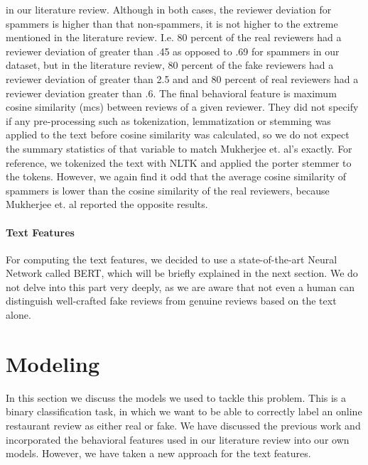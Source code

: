 in our literature review. Although in both cases, the reviewer deviation for spammers is higher than that non-spammers, it is not higher to the extreme mentioned in the literature review. I.e. 80 percent of the real reviewers had a reviewer deviation of greater than .45 as opposed to .69 for spammers in our dataset, but in the literature review, 80 percent of the fake reviewers had a reviewer deviation of greater than 2.5 and and 80 percent of real reviewers had a reviewer deviation greater than .6. The final behavioral feature is maximum cosine similarity (mcs) between reviews of a given reviewer. They did not specify if any pre-processing such as tokenization, lemmatization or stemming was applied to the text before cosine similarity was calculated, so we do not expect the summary statistics of that variable to match Mukherjee et. al's exactly. For reference, we tokenized the text with NLTK and applied the porter stemmer to the tokens. However, we again find it odd that the average cosine similarity of spammers is lower than the cosine similarity of the real reviewers, because Mukherjee et. al reported the opposite results.
\vspace{2mm}
\paragraph{Text Features} For computing the text features, we decided to use a state-of-the-art Neural Network called BERT, which will be briefly explained in the next section. We do not delve into this part very deeply, as we are aware that not even a human can distinguish well-crafted fake reviews from genuine reviews based on the text alone.


\section{Modeling}

In this section we discuss the models we used to tackle this problem. This is a binary classification task, in which we want to be able to correctly label an online restaurant review as either real or fake. We have discussed the previous work and incorporated the behavioral features used in our literature review into our own models. However, we have taken a new approach for the text features.

\vspace{2mm}

